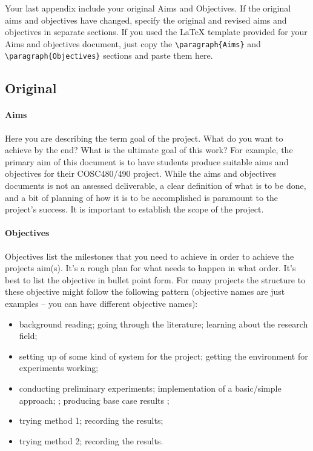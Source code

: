 \documentclass[12pt]{article}
\begin{document}
Your last appendix include your original Aims and Objectives.  If the original aims and objectives have changed, specify the original and revised aims and objectives in separate sections.  If you used the \LaTeX{} template provided for your Aims and objectives document, just copy the \verb$\paragraph{Aims}$ and \verb$\paragraph{Objectives}$ sections and paste them here.

\subsection*{Original}

\paragraph{Aims}
Here you are describing the term goal of the project.  What do you want to achieve by the end?  What is the ultimate goal of this work?  For example, the primary aim of this document is to have students produce suitable aims and objectives for their COSC480/490 project.  While the aims and objectives documents is not an assessed deliverable, a clear definition of what is to be done, and a bit of planning of how it is to be accomplished is paramount to the project's success.  It is important to establish the scope of the project.

\paragraph{Objectives}
Objectives list the milestones that you need to achieve in order to achieve the projects aim(s).  It's a rough plan for what needs to happen in what order.  It's best to list the objective in bullet point form.  For many projects the structure to these objective might follow the following pattern (objective names are just examples -- you can have different objective names):
\begin{itemize}[noitemsep]
	\item background reading; going through the literature; learning about the research field;
	\item setting up of some kind of system for the project; getting the environment for experiments working;
	\item conducting preliminary experiments; implementation of a basic/simple approach; ; producing base case results ;
	\item trying method 1; recording the results;
	\item trying method 2; recording the results.
\end{itemize}
\end{document}
